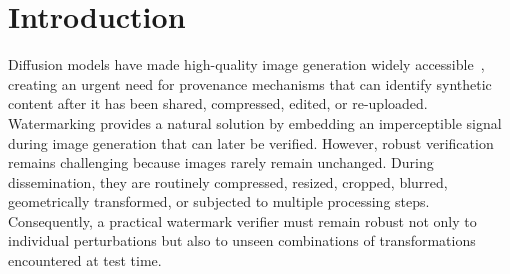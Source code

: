 \section{Introduction}
\label{sec:intro}

Diffusion models have made high-quality image generation widely accessible~\cite{ho2020denoising,rombach2022high}, creating an urgent need for provenance mechanisms that can identify synthetic content after it has been shared, compressed, edited, or re-uploaded. Watermarking provides a natural solution by embedding an imperceptible signal during image generation that can later be verified. However, robust verification remains challenging because images rarely remain unchanged. During dissemination, they are routinely compressed, resized, cropped, blurred, geometrically transformed, or subjected to multiple processing steps. Consequently, a practical watermark verifier must remain robust not only to individual perturbations but also to unseen combinations of transformations encountered at test time.



